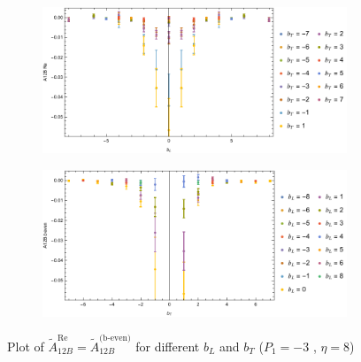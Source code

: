 \documentclass[]{article}
\numberwithin{equation}{section}
\newcommand{\tAmp}{\widetilde{A}}
\newcommand{\tAmp}{\ensuremath{\widetilde{A}^{(+)}}}
\begin{document}
\begin{figure}[h!]
     \centering
     \begin{subfigure}[b]{0.45\textwidth}
         \centering
         \includegraphics[width=\textwidth]{Amp_plots/bL_A12B_b_even_P1_-3_eta_8.pdf}
     \end{subfigure}
     \begin{subfigure}[b]{0.45\textwidth}
         \centering
         \includegraphics[width=\textwidth]{Amp_plots/bT_A12B_b_even_P1_-3_eta_8.pdf}
     \end{subfigure}
        \caption{Plot of  $\tAmp^{\text{Re}}_{12B}=\tAmp^{\text{(b-even)}}_{12B}$ for different $b_{L}$ and $b_{T}$  ($P_{1} = -3$ , $\eta=8$)}
\end{figure}
\end{document}
